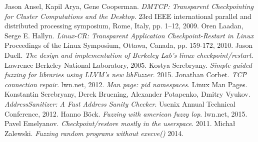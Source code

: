 \documentclass[a4paper]{article}
\begin{document}
\begin{thebibliography}{30}
        Jason Ansel, Kapil Arya, Gene Cooperman.
       \textit{DMTCP: Transparent Checkpointing for Cluster Computations and the Desktop}.
        23rd IEEE international parallel and distributed processing symposium, Rome, Italy, pp. 1–12, 2009.
        Oren Laadan, Serge E. Hallyn.
        \textit{Linux-CR: Transparent Application Checkpoint-Restart in Linux}
        Proceedings of the Linux Symposium, Ottawa, Canada, pp. 159-172, 2010.
        Jason Duell.
        \textit{The design and implementation of Berkeley Lab's linux checkpoint/restart}.
        Lawrence Berkeley National Laboratory, 2005. 
        Kostya Serebryany.
        \textit{Simple guided fuzzing for libraries using LLVM's new libFuzzer}.
        2015. 
        Jonathan Corbet.
        \textit{TCP connection repair}.
        lwn.net, 2012. 
        \textit{Man page: pid namespaces}.
        Linux Man Pages. 
        Konstantin Serebryany, Derek Bruening, Alexander Potapenko, Dmitry Vyukov.
        \textit{AddressSanitizer: A Fast Address Sanity Checker}.
        Usenix Annual Technical Conference, 2012. 
        Hanno Böck.
        \textit{Fuzzing with american fuzzy lop}.
        lwn.net, 2015. 
        Pavel Emelyanov.
        \textit{Checkpoint/restore mostly in the userspace}.
        2011. 
        Michał Zalewski.
        \textit{Fuzzing random programs without execve()}
        2014. 
\end{thebibliography}
\end{document}
